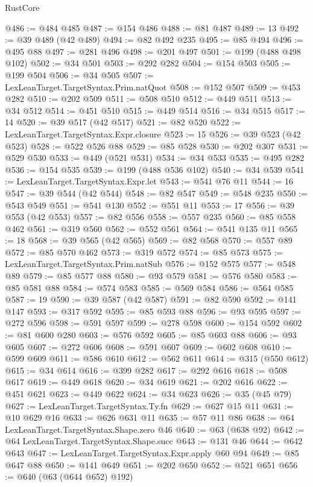 \begin{lexlean}{RustCore}
\begin{coremodule}
@486 := @484 @485
@487 := @154 @486
@488 := @81 @487
@489 := 13
@492 := @39 @489 (@42 @489)
@494 := @82 @492 @235
@495 := @85 @494
@496 := @495 @88
@497 := @281 @496
@498 := @201 @497
@501 := @199 (@488 @498 @102)
@502 := @34 @501
@503 := @292 @282
@504 := @154 @503
@505 := @199 @504
@506 := @34 @505
@507 := LexLeanTarget.TargetSyntax.Prim.natQuot
@508 := @152 @507
@509 := @453 @282
@510 := @202 @509
@511 := @508 @510
@512 := @449 @511
@513 := @34 @512
@514 := @451 @510
@515 := @449 @514
@516 := @34 @515
@517 := 14
@520 := @39 @517 (@42 @517)
@521 := @82 @520
@522 := LexLeanTarget.TargetSyntax.Expr.closure
@523 := 15
@526 := @39 @523 (@42 @523)
@528 := @522 @526 @88
@529 := @85 @528
@530 := @202 @307
@531 := @529 @530
@533 := @449 (@521 @531)
@534 := @34 @533
@535 := @495 @282
@536 := @154 @535
@539 := @199 (@488 @536 @102)
@540 := @34 @539
@541 := LexLeanTarget.TargetSyntax.Expr.let
@543 := @541 @76 @11
@544 := 16
@547 := @39 @544 (@42 @544)
@548 := @82 @547
@549 := @548 @235
@550 := @543 @549
@551 := @541 @130
@552 := @551 @11
@553 := 17
@556 := @39 @553 (@42 @553)
@557 := @82 @556
@558 := @557 @235
@560 := @85 @558 @462
@561 := @319 @560
@562 := @552 @561
@564 := @541 @135 @11
@565 := 18
@568 := @39 @565 (@42 @565)
@569 := @82 @568
@570 := @557 @89
@572 := @85 @570 @462
@573 := @319 @572
@574 := @85 @573
@575 := LexLeanTarget.TargetSyntax.Prim.natSub
@576 := @152 @575
@577 := @548 @89
@579 := @85 @577 @88
@580 := @93 @579
@581 := @576 @580
@583 := @85 @581 @88
@584 := @574 @583
@585 := @569 @584
@586 := @564 @585
@587 := 19
@590 := @39 @587 (@42 @587)
@591 := @82 @590
@592 := @141 @147
@593 := @317 @592
@595 := @85 @593 @88
@596 := @93 @595
@597 := @272 @596
@598 := @591 @597
@599 := @278 @598
@600 := @154 @592
@602 := @81 @600 @280
@603 := @576 @592
@605 := @85 @603 @88
@606 := @93 @605
@607 := @272 @606
@608 := @591 @607
@609 := @602 @608
@610 := @599 @609
@611 := @586 @610
@612 := @562 @611
@614 := @315 (@550 @612)
@615 := @34 @614
@616 := @399 @282
@617 := @292 @616
@618 := @508 @617
@619 := @449 @618
@620 := @34 @619
@621 := @202 @616
@622 := @451 @621
@623 := @449 @622
@624 := @34 @623
@626 := @35 (@45 @79)
@627 := LexLeanTarget.TargetSyntax.Ty.fn
@629 := @627 @15 @11
@631 := @10 @629 @16
@633 := @626 @631 @11
@635 := @57 @11 @86
@638 := @64 LexLeanTarget.TargetSyntax.Shape.zero @46
@640 := @63 (@638 @92)
@642 := @64 LexLeanTarget.TargetSyntax.Shape.succ
@643 := @131 @46
@644 := @642 @643
@647 := LexLeanTarget.TargetSyntax.Expr.apply @60 @94
@649 := @85 @647 @88
@650 := @141 @649
@651 := @202 @650
@652 := @521 @651
@656 := @640 (@63 (@644 @652) @192)

\end{coremodule}
\end{lexlean}
